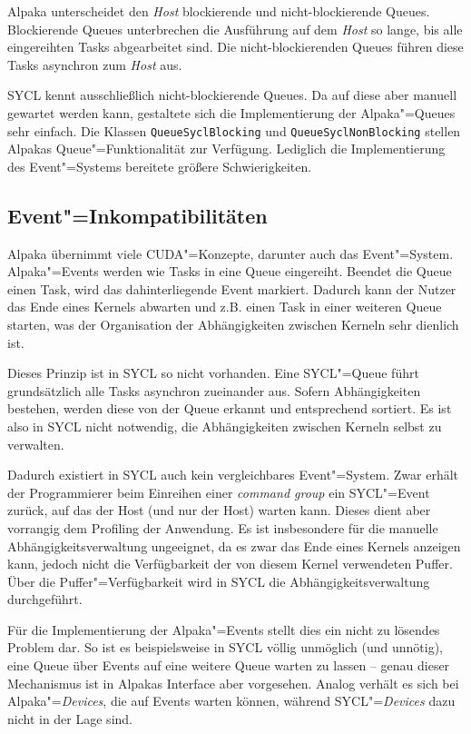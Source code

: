 Alpaka unterscheidet den \textit{Host} blockierende und nicht-blockierende
Queues. Blockierende Queues unterbrechen die Ausführung auf dem \textit{Host} so
lange, bis alle eingereihten Tasks abgearbeitet sind. Die nicht-blockierenden
Queues führen diese Tasks asynchron zum \textit{Host} aus.

SYCL kennt ausschließlich nicht-blockierende Queues. Da auf diese aber manuell
gewartet werden kann, gestaltete sich die Implementierung der Alpaka"=Queues
sehr einfach. Die Klassen \texttt{QueueSyclBlocking} und
\texttt{QueueSyclNonBlocking} stellen Alpakas Queue"=Funktionalität zur
Verfügung. Lediglich die Implementierung des Event"=Systems bereitete größere
Schwierigkeiten.

\subsection{Event"=Inkompatibilitäten}

Alpaka übernimmt viele CUDA"=Konzepte, darunter auch das Event"=System.
Alpaka"=Events werden wie Tasks in eine Queue eingereiht. Beendet die Queue
einen Task, wird das dahinterliegende Event markiert. Dadurch kann der Nutzer
das Ende eines Kernels abwarten und z.B. einen Task in einer weiteren Queue
starten, was der Organisation der Abhängigkeiten zwischen Kerneln sehr dienlich
ist.

Dieses Prinzip ist in SYCL so nicht vorhanden. Eine SYCL"=Queue führt
grundsätzlich alle Tasks asynchron zueinander aus. Sofern Abhängigkeiten
bestehen, werden diese von der Queue erkannt und entsprechend sortiert. Es ist
also in SYCL nicht notwendig, die Abhängigkeiten zwischen Kerneln selbst zu
verwalten.

Dadurch existiert in SYCL auch kein vergleichbares Event"=System. Zwar erhält
der Programmierer beim Einreihen einer \textit{command group} ein SYCL"=Event
zurück, auf das der Host (und nur der Host) warten kann. Dieses dient aber
vorrangig dem Profiling der Anwendung. Es ist insbesondere für die manuelle
Abhängigkeitsverwaltung ungeeignet, da es zwar das Ende eines Kernels anzeigen
kann, jedoch nicht die Verfügbarkeit der von diesem Kernel verwendeten Puffer.
Über die Puffer"=Verfügbarkeit wird in SYCL die Abhängigkeitsverwaltung
durchgeführt.

Für die Implementierung der Alpaka"=Events stellt dies ein nicht zu lösendes
Problem dar. So ist es beispielsweise in SYCL völlig unmöglich (und unnötig),
eine Queue über Events auf eine weitere Queue warten zu lassen -- genau dieser
Mechanismus ist in Alpakas Interface aber vorgesehen. Analog verhält es sich bei
Alpaka"=\textit{Devices}, die auf Events warten können, während
SYCL"=\textit{Devices} dazu nicht in der Lage sind.

